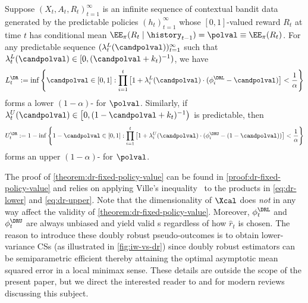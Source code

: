 \begin{theorem}\label{theorem:dr-fixed-policy-value}
 Suppose $(X_t, A_t, R_t)_{t=1}^\infty$ is an infinite sequence of contextual bandit data generated by the predictable policies $(h_t)_{t=1}^\infty$ whose $[0, 1]$-valued reward $R_t$ at time $t$ has conditional mean $\EE_\pi(R_t \mid \history_{t-1}) = \polval \equiv \EE_\pi (R_t)$. 
 For any predictable sequence $(\lambda_t^L(\candpolval))_{t=1}^\infty$ such that $\lambda_t^L(\candpolval) \in [0, (\candpolval + k_t)^{-1})$, we have
  \begin{equation}\label{eq:dr-lower}
    L_t^\DR := \inf \left \{ \candpolval \in [0, 1] : \prod_{i=1}^t \left [ 1 + \lambda_i^L(\candpolval) \cdot (\phi_i^\DRL - \candpolval) \right ] < \frac{1}{\alpha} \right \}
  \end{equation}
  forms a lower $(1-\alpha)$-\cs{} for $\polval$. Similarly, if $\lambda_t^U(\candpolval) \in \left [0, (1-\candpolval + k_t)^{-1}\right )$ is predictable, then
  \begin{equation}\label{eq:dr-upper}
    U_t^\DR := 1-\inf \left \{ 1-\candpolval \in [0, 1] : \prod_{i=1}^t \left [ 1 + \lambda_i^U(\candpolval) \cdot (\phi_i^\DRU - (1-\candpolval)) \right ] < \frac{1}{\alpha} \right \}
  \end{equation}
  forms an upper $(1-\alpha)$-\cs{} for $\polval$. 
\end{theorem}
The proof of \cref{theorem:dr-fixed-policy-value} can be found in \cref{proof:dr-fixed-policy-value} and relies on applying Ville's inequality~\citep{ville1939etude} to the products in \eqref{eq:dr-lower} and \eqref{eq:dr-upper}. Note that the dimensionality of $\Xcal$ does \emph{not} in any way affect the validity of \cref{theorem:dr-fixed-policy-value}. Moreover, $\phi_t^\DRL$ and $\phi_t^\DRU$ are always unbiased and yield valid \cs{}s regardless of how $\widehat r_t$ is chosen. The reason to introduce these doubly robust pseudo-outcomes is to obtain lower-variance CSs (as illustrated in \cref{fig:iw-vs-dr}) since doubly robust estimators can be semiparametric efficient thereby attaining the optimal asymptotic mean squared error in a local minimax sense. These details are outside the scope of the present paper, but we direct the interested reader to \citet{kennedy2022semiparametric} and \citet{uehara2022review} for modern reviews discussing this subject.

